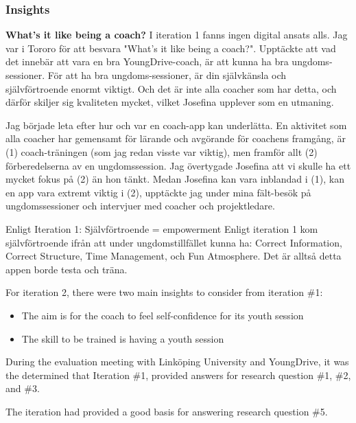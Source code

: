 \subsubsection{Insights}

\textbf{What's it like being a coach?} 
I iteration 1 fanns ingen digital ansats alls. Jag var i Tororo för att besvara "What's it like being a coach?". Upptäckte att vad det innebär att vara en bra YoungDrive-coach, är att kunna ha bra ungdoms-sessioner. För att ha bra ungdoms-sessioner, är din självkänsla och självförtroende enormt viktigt. Och det är inte alla coacher som har detta, och därför skiljer sig kvaliteten mycket, vilket Josefina upplever som en utmaning.

Jag började leta efter hur och var en coach-app kan underlätta. En aktivitet som alla coacher har gemensamt för lärande och avgörande för coachens framgång, är (1) coach-träningen (som jag redan visste var viktig), men framför allt (2) förberedelserna av en ungdomssession. Jag övertygade Josefina att vi skulle ha ett mycket fokus på (2) än hon tänkt. Medan Josefina kan vara inblandad i (1), kan en app vara extremt viktig i (2), upptäckte jag under mina fält-besök på ungdomssessioner och intervjuer med coacher och projektledare.

Enligt Iteration 1: Självförtroende = empowerment
Enligt iteration 1 kom självförtroende ifrån att under ungdomstillfället kunna ha: Correct Information, Correct Structure, Time Management, och Fun Atmosphere. Det är alltså detta appen borde testa och träna.

For iteration 2, there were two main insights to consider from iteration \#1:

\begin{itemize}
\item The aim is for the coach to feel self-confidence for its youth session
\item The skill to be trained is having a youth session
\end{itemize}

During the evaluation meeting with Linköping University and YoungDrive, it was the determined that Iteration \#1, provided answers for research question \#1, \#2, and \#3.

The iteration had provided a good basis for answering research question \#5.

